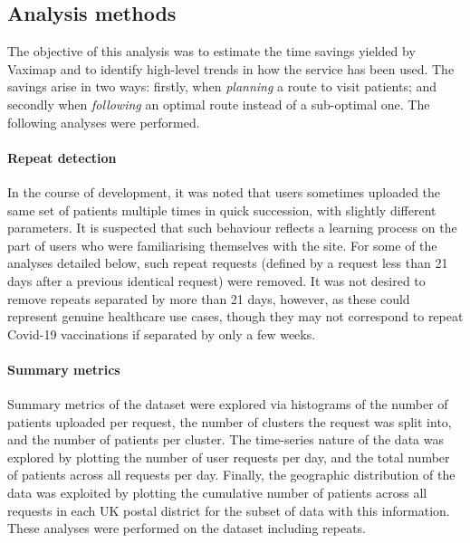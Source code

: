 \documentclass{article}
\def\vm{Vaximap}
\begin{document}
\subsection{Analysis methods}

The objective of this analysis was to estimate the time savings yielded by \vm{} and to identify high-level trends in how the service has been used. The savings arise in two ways: firstly, when \textit{planning} a route to visit patients; and secondly when \textit{following} an optimal route instead of a sub-optimal one. The following analyses were performed. 

\paragraph{Repeat detection}
 In the course of development, it was noted that users sometimes uploaded the same set of patients multiple times in quick succession, with slightly different parameters. It is suspected that such behaviour reflects a learning process on the part of users who were familiarising themselves with the site. For some of the analyses detailed below, such repeat requests (defined by a request less than 21 days after a previous identical request) were removed. It was not desired to remove repeats separated by more than 21 days, however, as these could represent genuine healthcare use cases, though they may not correspond to repeat Covid-19 vaccinations if separated by only a few weeks.

\paragraph{Summary metrics}
Summary metrics of the dataset were explored via histograms of the number of patients uploaded per request, the number of clusters the request was split into, and the number of patients per cluster. The time-series nature of the data was explored by plotting the number of user requests per day, and the total number of patients across all requests per day. Finally, the geographic distribution of the data was exploited by plotting the cumulative number of patients across all requests in each UK postal district for the subset of data with this information. These analyses were performed on the dataset including repeats.
\end{document}
